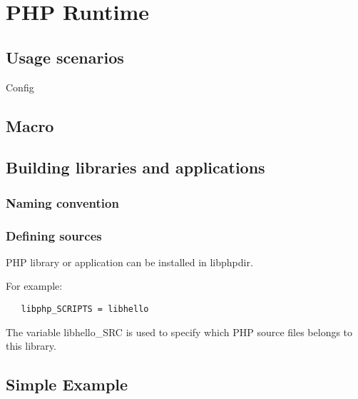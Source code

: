\section{PHP Runtime}


\subsection{Usage scenarios}
Config

\subsection{Macro}


\subsection{Building libraries and applications}

\subsubsection{Naming convention}

\subsubsection{Defining sources}

PHP library or application can be installed in libphpdir.

For example:
\begin{verbatim}
   libphp_SCRIPTS = libhello
\end{verbatim}

The variable libhello_SRC is used to specify which PHP source files belongs to this library.



\subsection{Simple Example}